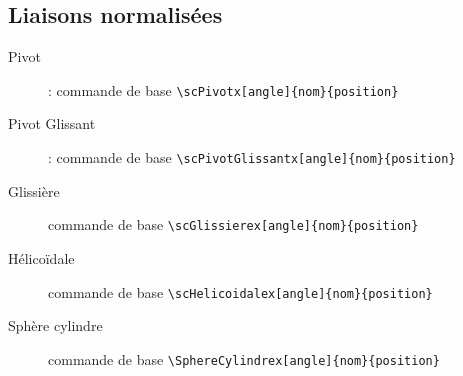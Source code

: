 \documentclass[a4paper,11pt]{article}                      %
\begin{document}
\subsection{Liaisons normalisées}
\begin{description}
\item[Pivot] : commande de base \verb"\scPivotx[angle]{nom}{position}" 

\begin{tkzexample}
\end{tkzexample}


\item [Pivot Glissant] : commande de base \verb"\scPivotGlissantx[angle]{nom}{position}" 

\begin{tkzexample}
\end{tkzexample}

\item[Glissière] commande de base \verb"\scGlissierex[angle]{nom}{position}" 

\begin{tkzexample}
\end{tkzexample}


\item[Hélicoïdale] commande de base \verb"\scHelicoidalex[angle]{nom}{position}" 

\begin{tkzexample}
\end{tkzexample}

\item[Sphère cylindre] commande de base \verb"\SphereCylindrex[angle]{nom}{position}" 


\begin{tkzexample}
\end{tkzexample}


\end{description}
\end{document}
